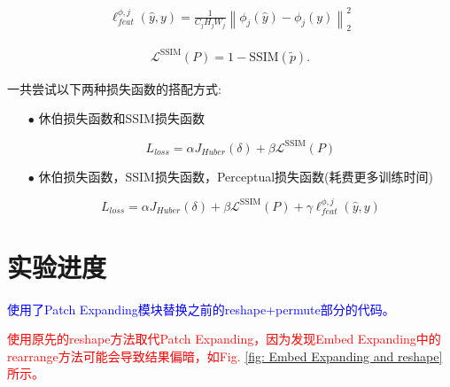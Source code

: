 \documentclass[a4paper]{ctexart}
\begin{document}
		\begin{equation}
			\begin{aligned}
				\ell_{feat}^{\phi,j} (\hat{y},y) = \frac{1}{C_{j}H_{j}W_{j}}{\left\| \phi_{j}(\hat{y})-\phi_{j}(y)\right\|}_{2}^2
			\end{aligned}
			\label{eq: perceptual loss}
		\end{equation}
		
		\begin{equation}
			\begin{aligned}
				\mathcal{L}^{\text{SSIM}}(P)=1-\text{SSIM}(\tilde{p}).
			\end{aligned}
			\label{eq: revised_SSIM loss}
		\end{equation}
		
		
		一共尝试以下两种损失函数的搭配方式:
		
		\begin{itemize}
			\item[$\bullet$]
			休伯损失函数和SSIM损失函数
			
			\begin{equation}
				L_{loss} = \alpha J_{Huber}(\delta) + \beta \mathcal{L}^{\text{SSIM}}(P)
			\end{equation}
			
			\item[$\bullet$]
			休伯损失函数，SSIM损失函数，Perceptual损失函数(耗费更多训练时间)
			
			\begin{equation}
				L_{loss} = \alpha J_{Huber}(\delta) + \beta \mathcal{L}^{\text{SSIM}}(P) + \gamma \ell_{feat}^{\phi,j} (\hat{y},y)
			\end{equation}
		\end{itemize}
		
	\section{实验进度}
		
		\textcolor{blue}{使用了Patch Expanding模块替换之前的reshape+permute部分的代码。}
		
		\textcolor{red}{使用原先的reshape方法取代Patch Expanding，因为发现Embed Expanding中的rearrange方法可能会导致结果偏暗，如Fig. \ref{fig: Embed Expanding and reshape}所示。}
		
\end{document}
